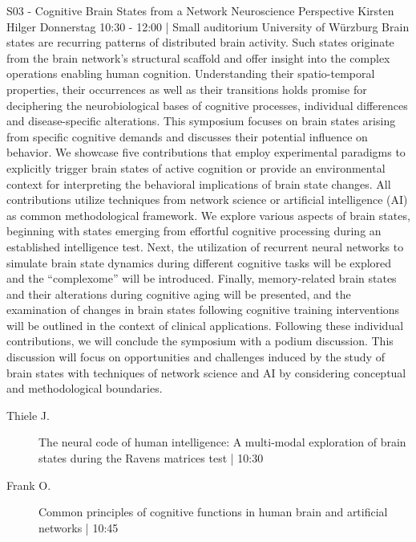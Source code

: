 
            \begin{symposium}
            {S03 - Cognitive Brain States from a Network Neuroscience Perspective }
            {Kirsten Hilger}
            {Donnerstag 10:30 - 12:00 | Small auditorium}
            {University of Würzburg}
            Brain states are recurring patterns of distributed brain activity. Such states originate from the brain network's structural scaffold and offer insight into the complex operations enabling human cognition. Understanding their spatio-temporal properties, their occurrences as well as their transitions holds promise for deciphering the neurobiological bases of cognitive processes, individual differences and disease-specific alterations.
This symposium focuses on brain states arising from specific cognitive demands and discusses their potential influence on behavior. We showcase five contributions that employ experimental paradigms to explicitly trigger brain states of active cognition or provide an environmental context for interpreting the behavioral implications of brain state changes. All contributions utilize techniques from network science or artificial intelligence (AI) as common methodological framework.
We explore various aspects of brain states, beginning with states emerging from effortful cognitive processing during an established intelligence test. Next, the utilization of recurrent neural networks to simulate brain state dynamics during different cognitive tasks will be explored and the “complexome” will be introduced. Finally, memory-related brain states and their alterations during cognitive aging will be presented, and the examination of changes in brain states following cognitive training interventions will be outlined in the context of clinical applications.
Following these individual contributions, we will conclude the symposium with a podium discussion. This discussion will focus on opportunities and challenges induced by the study of brain states with techniques of network science and AI by considering conceptual and methodological boundaries.
            \begin{description}    
            
                \item [ Thiele J.] The neural code of human intelligence: A multi-modal exploration of brain states during the Ravens matrices test \textcolor{mygray}{ | 10:30}    
                
                \item [ Frank O.] Common principles of cognitive functions in human brain and artificial networks  \textcolor{mygray}{ | 10:45}    
                

\end{description}
\end{symposium}
